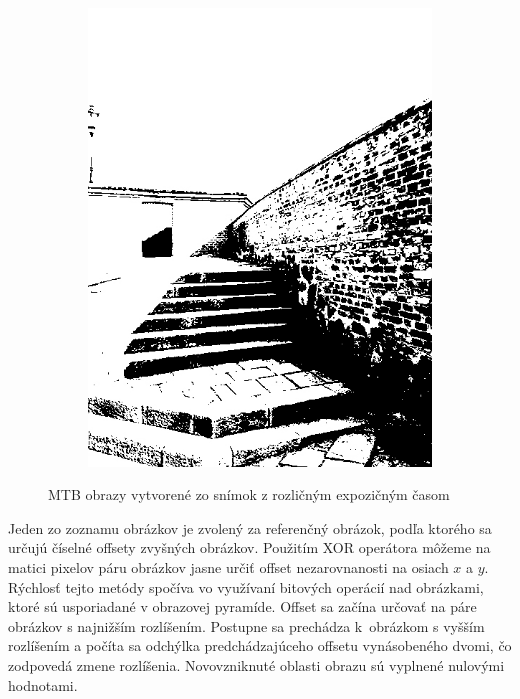 \begin{figure}[t]
\begin{subfigure}{0.3\textwidth}
        \includegraphics[width=\textwidth]{figures/capturing/align/image2tb}
    \end{subfigure}
    \caption{MTB obrazy vytvorené zo snímok z rozličným expozičným časom}
    \label{fig:mtb}
  \end{figure}

Jeden zo zoznamu obrázkov je zvolený za referenčný obrázok, podľa ktorého sa určujú číselné offsety zvyšných obrázkov.
Použitím XOR operátora môžeme na matici pixelov páru obrázkov jasne určiť offset nezarovnanosti na osiach $x$ a $y$.
Rýchlosť tejto metódy spočíva vo využívaní bitových operácií nad obrázkami, ktoré sú usporiadané v obrazovej pyramíde.
Offset sa začína určovať na páre obrázkov s najnižším rozlíšením. Postupne sa prechádza k~obrázkom s vyšším rozlíšením
a počíta sa odchýlka predchádzajúceho offsetu vynásobeného dvomi, čo zodpovedá zmene rozlíšenia.
Novovzniknuté oblasti obrazu sú vyplnené nulovými hodnotami.
